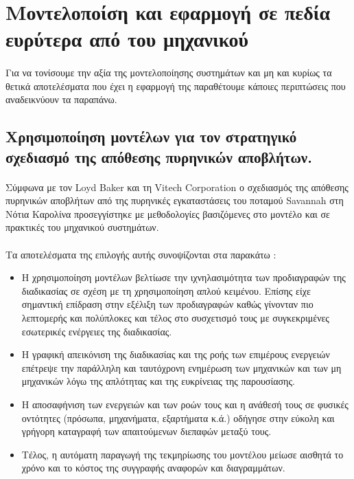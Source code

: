 \documentclass[a4paper,12pt,twoside]{report}
\begin{document}
		\section{Μοντελοποίση και εφαρμογή σε πεδία ευρύτερα από του μηχανικού}
			\paragraph{} {Για να τονίσουμε την αξία της μοντελοποίησης συστημάτων και μη και κυρίως τα θετικά αποτελέσματα που έχει η εφαρμογή της παραθέτουμε κάποιες περιπτώσεις που αναδεικνύουν τα παραπάνω.
			}

			\subsection{Χρησιμοποίηση μοντέλων  για τον στρατηγικό σχεδιασμό της απόθεσης πυρηνικών αποβλήτων.}
			
				\paragraph{} {Σύμφωνα με τον Loyd Baker και τη Vitech Corporation \cite{MBEStrategicPlanActivity} ο σχεδιασμός της απόθεσης πυρηνικών αποβλήτων  από της πυρηνικές εγκαταστάσεις του ποταμού Savannah στη Νότια Καρολίνα προσεγγίστηκε με μεθοδολογίες βασιζόμενες στο μοντέλο και σε πρακτικές του μηχανικού συστημάτων.
				}
				\paragraph{} {Τα αποτελέσματα της επιλογής αυτής συνοψίζονται στα παρακάτω :}
				\begin{itemize}
					\item Η χρησιμοποίηση μοντέλων βελτίωσε την ιχνηλασιμότητα  των προδιαγραφών της διαδικασίας σε σχέση με τη χρησιμοποίηση απλού κειμένου. Επίσης είχε σημαντική επίδραση στην εξέλιξη των προδιαγραφών καθώς γίνονταν πιο λεπτομερής και πολύπλοκες και τέλος στο συσχετισμό τους με συγκεκριμένες εσωτερικές ενέργειες της διαδικασίας.
					\item Η γραφική απεικόνιση της διαδικασίας και της ροής των επιμέρους ενεργειών επέτρεψε την παράλληλη και ταυτόχρονη ενημέρωση των μηχανικών και των μη μηχανικών λόγω της απλότητας και της ευκρίνειας της παρουσίασης.
					\item Η αποσαφήνιση των ενεργειών και των ροών τους και η ανάθεσή τους σε φυσικές οντότητες (πρόσωπα, μηχανήματα, εξαρτήματα κ.ά.) οδήγησε στην εύκολη και γρήγορη καταγραφή των απαιτούμενων διεπαφών μεταξύ τους.
					\item Τέλος, η αυτόματη παραγωγή της τεκμηρίωσης του μοντέλου μείωσε αισθητά το χρόνο και το κόστος της συγγραφής αναφορών και διαγραμμάτων.
				\end{itemize}
				
\end{document}
